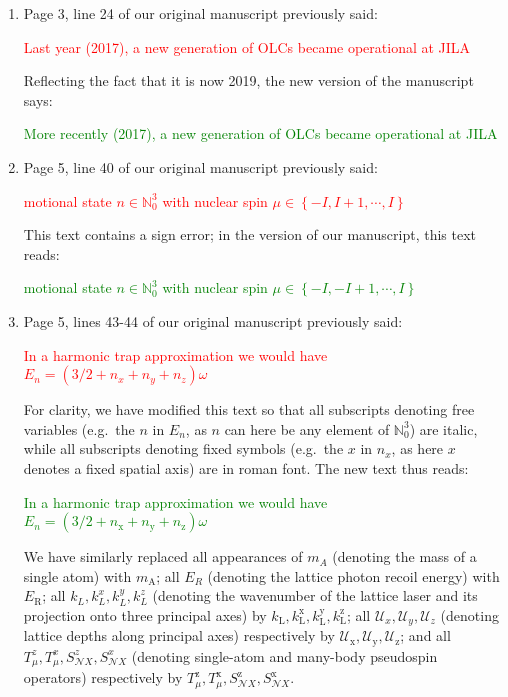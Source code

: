 \documentclass[preprint]{revtex4-1}
\renewcommand{\t}{\text} %
\newcommand{\p}[1]{\left(#1\right)} %
\renewcommand{\set}[1]{\left\{#1\right\}} %
\newcommand{\x}{\text{x}}
\newcommand{\y}{\text{y}}
\newcommand{\z}{\text{z}}
\newcommand{\N}{\mathcal{N}}
\newcommand{\U}{\mathcal{U}}
\newcommand{\1}{\mathds{1}}
\newcommand{\red}[1]{\textcolor{red}{#1}}
\newcommand{\green}[1]{\textcolor{green}{#1}}
\begin{document}
\begin{enumerate}[label=(R3.\arabic*)]
\item Page 3, line 24 of our original manuscript previously said:

  \red{Last year (2017), a new generation of OLCs became operational
    at JILA}

  Reflecting the fact that it is now 2019, the new version of the
  manuscript says:

  \green{More recently (2017), a new generation of OLCs became
    operational at JILA}


\item Page 5, line 40 of our original manuscript previously said:

  \red{motional state $n\in\mathbb{N}_0^3$ with nuclear spin
    $\mu\in\set{-I,I+1,\cdots,I}$}

  This text contains a sign error; in the version of our manuscript,
  this text reads:

  \green{motional state $n\in\mathbb{N}_0^3$ with nuclear spin
    $\mu\in\set{-I,-I+1,\cdots,I}$}


\item Page 5, lines 43-44 of our original manuscript previously said:

  \red{In a harmonic trap approximation we would have
    $E_n=\p{3/2+n_x+n_y+n_z}\omega$}

  For clarity, we have modified this text so that all subscripts
  denoting free variables (e.g.~the $n$ in $E_n$, as $n$ can here be
  any element of $\mathbb{N}_0^3$) are italic, while all subscripts
  denoting fixed symbols (e.g.~the $x$ in $n_x$, as here $x$ denotes a
  fixed spatial axis) are in roman font.  The new text thus reads:

  \green{In a harmonic trap approximation we would have
    $E_n=\p{3/2+n_\x+n_\y+n_\z}\omega$}

  We have similarly replaced all appearances of $m_A$ (denoting the
  mass of a single atom) with $m_{\text{A}}$; all $E_R$ (denoting the
  lattice photon recoil energy) with $E_{\t{R}}$; all
  $k_L,k_L^x,k_L^y,k_L^z$ (denoting the wavenumber of the lattice
  laser and its projection onto three principal axes) by
  $k_{\text{L}}, k_{\text{L}}^\x, k_{\text{L}}^\y, k_{\text{L}}^\z$;
  all $\U_x,\U_y,\U_z$ (denoting lattice depths along principal axes)
  respectively by $\U_\x,\U_\y,\U_\z$; and all
  $T_\mu^z,T_\mu^x,S_{\N X}^z,S_{\N X}^x$ (denoting single-atom and
  many-body pseudospin operators) respectively by
  $T_\mu^\z,T_\mu^\x,S_{\N X}^\z,S_{\N X}^\x$.


\end{enumerate}
\end{document}
